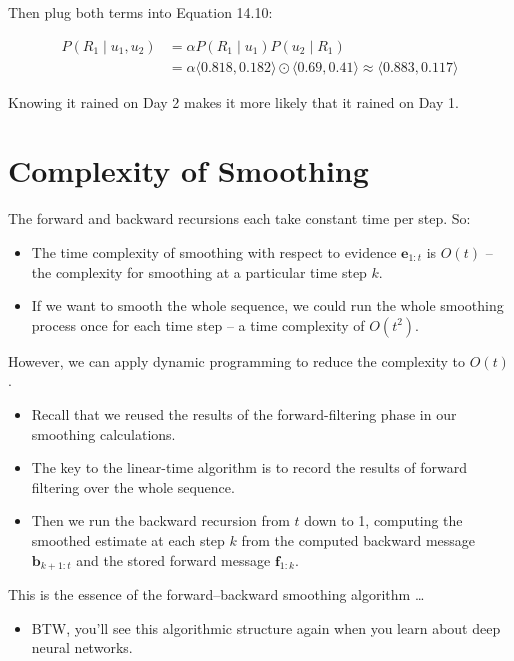 \documentclass[11pt]{article}
\begin{document}
Then plug both terms into Equation 14.10:

\vspace{-.2in}
\begin{align*}
P(R_1 \mid u_1, u_2) &= \alpha P(R_1 \mid u_1) P(u_2 \mid R_1) \tag{14.10} \\
                      &= \alpha \langle 0.818, 0.182 \rangle \odot \langle 0.69, 0.41 \rangle \approx \langle 0.883, 0.117 \rangle
\end{align*}

Knowing it rained on Day 2 makes it more likely that it rained on Day 1.
\section{Complexity of Smoothing}
\label{sec:org8d62cc5}

The forward and backward recursions each take constant time per step.  So:

\begin{itemize}
\item The time complexity of smoothing with respect to evidence \(\bm{e}_{1:t}\) is \(O(t)\) -- the complexity for smoothing at a particular time step \(k\).

\item If we want to smooth the whole sequence, we could run the whole smoothing process once for each time step -- a time complexity of \(O(t^2)\).
\end{itemize}

However, we can apply dynamic programming to reduce the complexity to \(O(t)\).

\begin{itemize}
\item Recall that we reused the results of the forward-filtering phase in our smoothing calculations.

\item The key to the linear-time algorithm is to record the results of forward filtering over the whole sequence.

\item Then we run the backward recursion from \(t\) down to 1, computing the smoothed estimate at each step \(k\) from the computed backward message \(\bm{b}_{k+1:t}\) and the stored forward message \(\bm{f}_{1:k}\).
\end{itemize}

This is the essence of the forward–backward smoothing algorithm \ldots{}

\begin{itemize}
\item BTW, you'll see this algorithmic structure again when you learn about deep neural networks.
\end{itemize}
\end{document}
